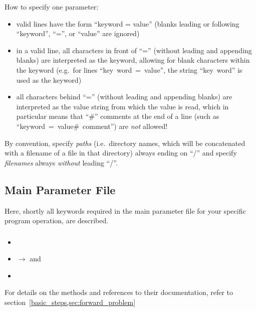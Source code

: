 How to specify one parameter:
\begin{itemize}
\item valid lines have the form ``keyword = value'' (blanks leading or following ``keyword'', ``='', or ``value'' are ignored)
\item in a valid line, all characters in front of ``='' (without leading and appending blanks)
are interpreted as the keyword, allowing for blank characters within the keyword (e.g.\ for lines  
\mbox{``\hspace{5mm}key~word~=~value\hspace{3mm}''}, the string ``key~word'' is used as the keyword)
\item all characters behind ``='' (without leading and appending blanks) are interpreted as the value string from 
which the value is read, which in particular means that ``\#'' comments at the end of a line (such as 
\mbox{``\hspace{3mm}keyword = value\hspace{2mm}\# comment\hspace{3mm}''}) are \emph{not} allowed!
\end{itemize}
By convention, specify \emph{paths} (i.e.\ directory names, which will be concatenated with a filename of 
a file in that directory) always ending on ``/'' and specify \emph{filenames} always \emph{without} leading ``/''.
%
\subsection{Main Parameter File} \label{files,sec:main_parfile}
%
Here, shortly all keywords required in the main parameter file for your specific program operation, are described.
\subsubsection{} \label{files,sec:main_parfile,itm:forward_method}
\begin{itemize}
\item[] 
\item[]  $\rightarrow$  and 
\item[]  
\end{itemize}
For details on the methods and references to their documentation, refer to section~\ref{basic_steps,sec:forward_problem}
